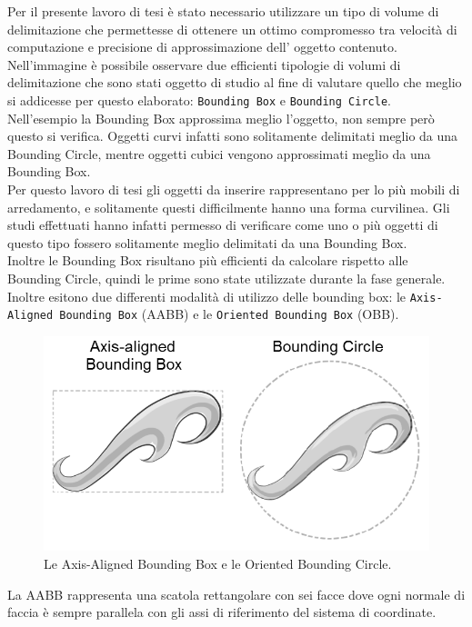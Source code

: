 Per il presente lavoro di tesi è stato necessario utilizzare un tipo di volume di delimitazione che permettesse di ottenere un ottimo compromesso tra velocità di computazione e precisione di approssimazione dell’ oggetto contenuto.
\\
Nell’immagine è possibile osservare due efficienti tipologie di volumi di delimitazione che sono stati oggetto di studio al fine di valutare quello che meglio si addicesse per questo elaborato: \texttt{Bounding Box} e \texttt{Bounding Circle}.
\\
Nell’esempio la Bounding Box approssima meglio l’oggetto, non sempre però questo si verifica. 
Oggetti curvi infatti sono solitamente delimitati meglio da una Bounding Circle, mentre oggetti cubici vengono approssimati meglio da una Bounding Box.
\\
Per questo lavoro di tesi gli oggetti da inserire rappresentano per lo più mobili di arredamento, e solitamente questi difficilmente hanno una forma curvilinea. Gli studi effettuati hanno infatti permesso di verificare come uno o più oggetti di questo tipo fossero solitamente meglio delimitati da una Bounding Box.
\\
Inoltre le Bounding Box risultano più efficienti da calcolare rispetto alle Bounding Circle, quindi le prime sono state utilizzate durante la fase generale.
Inoltre esitono due differenti modalità di utilizzo delle bounding box: le \texttt{Axis-Aligned Bounding Box} (AABB) e le \texttt{Oriented Bounding Box} (OBB).
\begin{figure}[htb]
 \centering
 \includegraphics[width=0.7\linewidth]{images/chapter_navigazione_scena/box1.png}\hfill
 \caption[AABB e OBB.]{Le Axis-Aligned Bounding Box e le Oriented Bounding Circle.}
 \label{fig:navigazione_scena_navigator_oculus}
\end{figure}
La AABB rappresenta una scatola rettangolare con sei facce dove ogni normale di faccia è sempre parallela con gli assi di riferimento del sistema di coordinate.
\\
